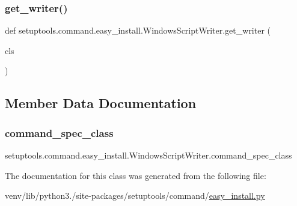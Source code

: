 \subsubsection{\texorpdfstring{get\+\_\+writer()}{get\_writer()}}
{\footnotesize\ttfamily def setuptools.\+command.\+easy\+\_\+install.\+Windows\+Script\+Writer.\+get\+\_\+writer (\begin{DoxyParamCaption}\item[{}]{cls }\end{DoxyParamCaption})}



\subsection{Member Data Documentation}
\mbox{\label{classsetuptools_1_1command_1_1easy__install_1_1WindowsScriptWriter_ab6b5a19df08d762e4fa963fc6c75e4c8}} 
\subsubsection{\texorpdfstring{command\+\_\+spec\+\_\+class}{command\_spec\_class}}
{\footnotesize\ttfamily setuptools.\+command.\+easy\+\_\+install.\+Windows\+Script\+Writer.\+command\+\_\+spec\+\_\+class\hspace{0.3cm}{\ttfamily [static]}}



The documentation for this class was generated from the following file\+:\begin{DoxyCompactItemize}
\item 
venv/lib/python3./site-\/packages/setuptools/command/\hyperlink{easy__install_8py}{easy\+\_\+install.\+py}\end{DoxyCompactItemize}
